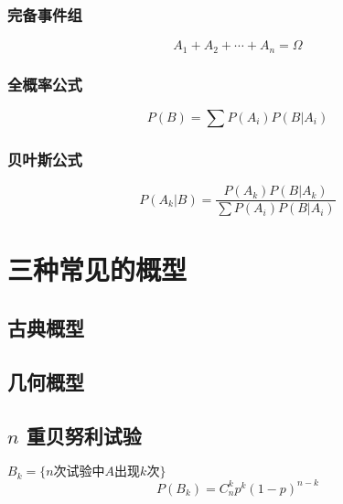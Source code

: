 \subsubsection{完备事件组}
\label{ssub:完备事件组}

\[
	A_1 + A_2 + \cdots + A_n = \Omega
\]

\subsubsection{全概率公式}
\label{ssub:全概率公式}

\[
	P(B) = \sum P(A_i) P(B | A_i)
\]

\subsubsection{贝叶斯公式}
\label{ssub:贝叶斯公式}

\[
	P(A_k | B ) = \frac{P(A_k) P(B | A_k)}{\sum P(A_i) P(B | A_i)}
\]

\section{三种常见的概型}
\label{sec:三种常见的概型}

\subsection{古典概型}
\label{sub:古典概型}

\subsection{几何概型}
\label{sub:几何概型}

\subsection{$n$ 重贝努利试验}
\label{sub:n_重贝努利试验}

$B_k= \{ n \text{次试验中}A \text{出现}k\text{次} \}$
\[
	P(B_k) = C_n^k p^k (1-p)^{n-k}
\]
